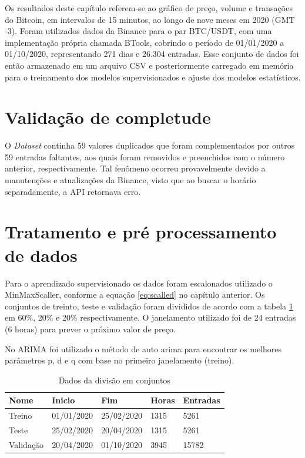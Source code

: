 Os resultados deste capítulo referem-se ao gráfico de preço, volume e transações do Bitcoin, em intervalos de 15 minutos, ao longo de nove meses em 2020 (GMT -3).
Foram utilizados dados da Binance para o par BTC/USDT, com uma implementação própria chamada BTools, cobrindo o período de 01/01/2020 a 01/10/2020, representando 271 dias e 26.304 entradas.
Esse conjunto de dados foi então armazenado em um arquivo CSV e posteriormente carregado em memória para o treinamento dos modelos supervisionados e ajuste dos modelos estatísticos.

\section{Validação de completude}
O \textit{Dataset} continha 59 valores duplicados que foram complementados por outros 59 entradas faltantes, aos quais foram removidos e preenchidos com o número anterior, respectivamente.
Tal fenômeno ocorreu provavelmente devido a manutenções e atualizações da Binance, visto que ao buscar o horário separadamente, a API retornava erro.

\section{Tratamento e pré processamento de dados}
Para o aprendizado supervisionado os dados foram escalonados utilizado o MinMaxScaller, conforme a equação \ref{eq:scalled} no capítulo anterior. Os conjuntos de treinto, teste e validação foram divididos de acordo com a tabela \ref{tab:conjuntos} em 60\%, 20\% e 20\% respectivamente. 
O janelamento utilizado foi de 24 entradas (6 horas) para prever o próximo valor de preço.

No ARIMA foi utilizado o método de auto arima para encontrar os melhores parâmetros p, d e q com base no primeiro janelamento (treino).

\begin{table}[!htb]
    \caption{Dados da divisão em conjuntos} \label{tab:conjuntos}
    \begin{tabularx}{\textwidth}{X|X|X|X|X}
    \hline
    Nome & Inicio & Fim & Horas & Entradas \\ \hline
    Treino   & 01/01/2020      & 25/02/2020            & 1315      & 5261          \\ \hline
    Teste   & 25/02/2020     & 20/04/2020            & 1315     & 5261         \\ \hline
    Validação   & 20/04/2020      & 01/10/2020             & 3945     & 15782         \\ \hline
    \end{tabularx}
\end{table}

